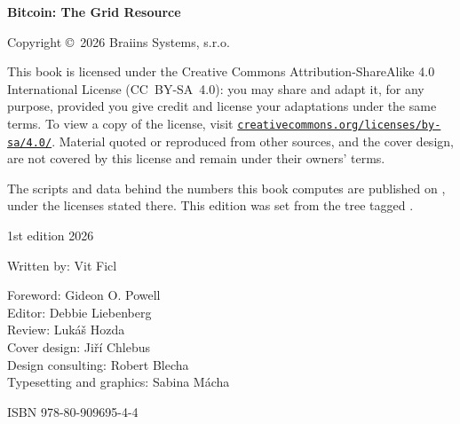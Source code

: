 \clearpage
\thispagestyle{empty}
{\small\setlength{\parindent}{0pt}\setlength{\parskip}{0.8em}
\textbf{Bitcoin: The Grid Resource}

\vspace{1.5em}
Copyright \copyright\ 2026 Braiins Systems, s.r.o.

This book is licensed under
the Creative Commons Attribution-ShareAlike 4.0 International License
\mbox{(CC BY-SA 4.0)}: you may share and adapt it, for any purpose, provided you give credit and
license your adaptations under the same terms. To view a copy of the license,
visit {\def\UrlBreaks{\do\/}\def\UrlBigBreaks{}\href{https://creativecommons.org/licenses/by-sa/4.0/}{\nolinkurl{creativecommons.org/licenses/by-sa/4.0/}}}.
Material quoted or reproduced from other sources, and the cover design, are not
covered by this license and remain under their owners' terms.

The scripts and data behind the numbers this book computes are published on
\repourl, under the licenses stated there. This edition was set from the tree
tagged \texttt{\editiontag}.

1st edition 2026

Written by: Vit Ficl

Foreword: Gideon O. Powell\\
Editor: Debbie Liebenberg\\
Review: Lukáš Hozda\\
Cover design: Jiří Chlebus\\
Design consulting: Robert Blecha\\
Typesetting and graphics: Sabina Mácha

\vspace*{\fill}
ISBN 978-80-909695-4-4\par}
\clearpage
